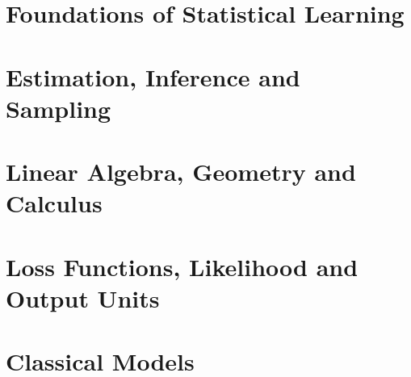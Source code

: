 
\part{Foundations of Statistical Learning}








\part{Estimation, Inference and Sampling}








\part{Linear Algebra, Geometry and Calculus}







\part{Loss Functions, Likelihood and Output Units}





\part{Classical Models}










